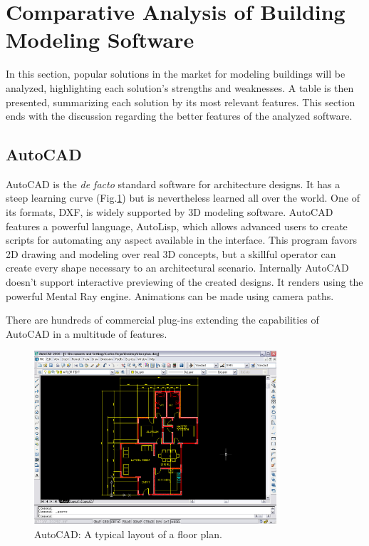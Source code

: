 \section{Comparative Analysis of Building Modeling Software}

In this section, popular solutions in the market for modeling buildings will be analyzed,
highlighting each solution's strengths and weaknesses.
A table is then presented, summarizing each solution by its most relevant features.
This section ends with the discussion regarding the better features of the analyzed software.

\subsection{AutoCAD}
AutoCAD \cite{SITE-AUTOCAD} is the \emph{de facto} standard software for architecture designs.
It has a steep learning curve (Fig.\ref{FIG-AUTOCAD}) but is nevertheless
learned all over the world.
One of its formats, DXF, is widely supported by 3D modeling software.
AutoCAD features a powerful language, AutoLisp, which allows advanced users to create scripts for
automating any aspect available in the interface.
This program favors 2D drawing and modeling over real 3D concepts,
but a skillful operator can create every shape necessary to an architectural scenario.
Internally AutoCAD doesn't support interactive previewing of the created designs.
It renders using the powerful Mental Ray\nocite{SITE-MENTAL} engine.
Animations can be made using camera paths.

There are hundreds of commercial plug-ins extending the capabilities of AutoCAD in a multitude of features.

\begin{figure}[!ht]
    \centering
    \includegraphics[width=9cm]{gfx/autocad-1.png}
    \caption{AutoCAD: A typical layout of a floor plan.}
    \label{FIG-AUTOCAD}
\end{figure}


